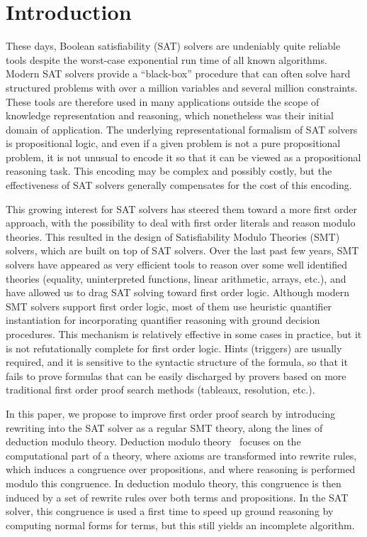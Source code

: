 
\section{Introduction}

These days, Boolean satisfiability (SAT) solvers are undeniably quite reliable
tools despite the worst-case exponential run time of all known
algorithms. Modern SAT solvers provide a ``black-box'' procedure that can often
solve hard structured problems with over a million variables and several million
constraints. These tools are therefore used in many applications outside the
scope of knowledge representation and reasoning, which nonetheless was their
initial domain of application. The underlying representational formalism of SAT
solvers is propositional logic, and even if a given problem is not a pure
propositional problem, it is not unusual to encode it so that it can be viewed
as a propositional reasoning task. This encoding may be complex and possibly
costly, but the effectiveness of SAT solvers generally compensates for the cost
of this encoding.

This growing interest for SAT solvers has steered them toward a more first order
approach, with the possibility to deal with first order literals and reason
modulo theories. This resulted in the design of Satisfiability Modulo Theories
(SMT) solvers, which are built on top of SAT solvers. Over the last past few
years, SMT solvers have appeared as very efficient tools to reason over some
well identified theories (equality, uninterpreted functions, linear arithmetic,
arrays, etc.), and have allowed us to drag SAT solving toward first order logic.
Although modern SMT solvers support first order logic, most of them use
heuristic quantifier instantiation for incorporating quantifier reasoning with
ground decision procedures. This mechanism is relatively effective in some cases
in practice, but it is not refutationally complete for first order logic. Hints
(triggers) are usually required, and it is sensitive to the syntactic structure
of the formula, so that it fails to prove formulas that can be easily discharged
by provers based on more traditional first order proof search methods (tableaux,
resolution, etc.).

In this paper, we propose to improve first order proof search by introducing
rewriting into the SAT solver as a regular SMT theory, along the lines of
deduction modulo theory. Deduction modulo theory~\cite{DA03} focuses on the
computational part of a theory, where axioms are transformed into rewrite rules,
which induces a congruence over propositions, and where reasoning is performed
modulo this congruence. In deduction modulo theory, this congruence is then
induced by a set of rewrite rules over both terms and propositions. In the SAT
solver, this congruence is used a first time to speed up ground reasoning
by computing normal forms for terms, but this still yields an incomplete
algorithm.

